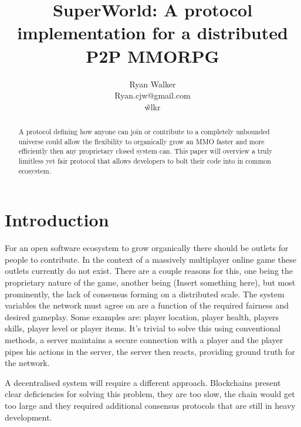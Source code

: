 \documentclass[runningheads,a4paper]{llncs}
\begin{document}
\def \SystemName {SuperWorld} %

\mainmatter  %

\title{\SystemName: A protocol implementation for a distributed P2P MMORPG}

\author{Ryan Walker\\
				Ryan.cjw@gmail.com\\
				\~wlkr}


\maketitle


\begin{abstract}
A protocol defining how anyone can join or contribute to a completely unbounded universe could allow the flexibility to organically grow an MMO faster and more efficiently then any proprietary closed system can. This paper will overview a truly limitless yet fair protocol that allows developers to bolt their code into in common ecosystem. 
\end{abstract}

\section{Introduction}
For an open software ecosystem to grow organically there should be outlets for people to contribute. In the context of a massively multiplayer online game these outlets currently do not exist. There are a couple reasons for this, one being the proprietary nature of the game, another being (Insert something here), but most prominently, the lack of consensus forming on a distributed scale. The system variables the network must agree on are a function of the required fairness and desired gameplay. Some examples are: player location, player health, players skills, player level or player items. It's trivial to solve this using conventional methods, a server maintains a secure connection with a player and the player pipes his actions in the server, the server then reacts, providing ground truth for the network.

A decentralised system will require a different approach. Blockchains present clear deficiencies for solving this problem, they are too slow, the chain would get too large and they required additional consensus protocols that are still in heavy development. 
\end{document}
